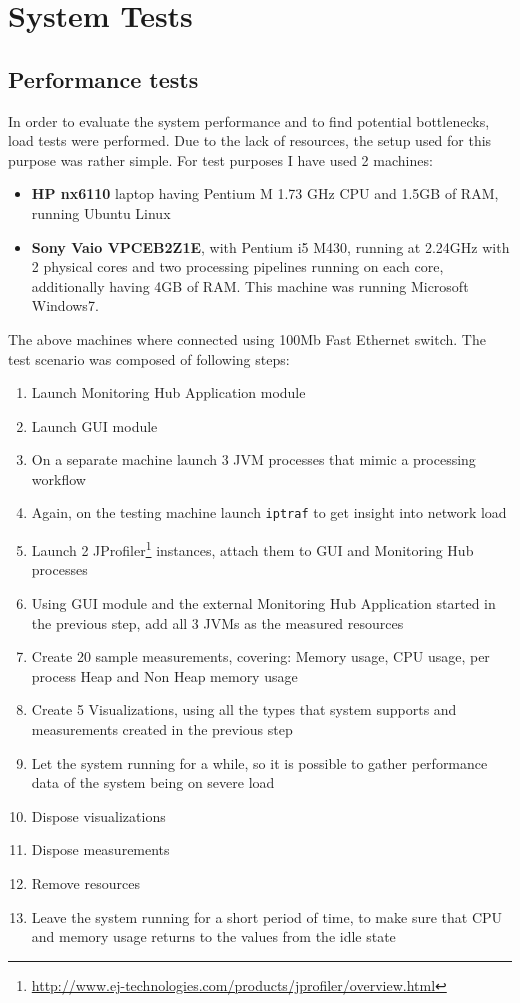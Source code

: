 %
\section{System Tests}
\label{sec:tests}
\subsection{Performance tests}

In order to evaluate the system performance and to find potential bottlenecks, load tests were performed. Due to the lack of resources, the setup used for this purpose was rather simple. For test purposes I have used 2 machines: 

\begin{itemize}
\item {\bf HP nx6110} laptop having Pentium M 1.73 GHz CPU and 1.5GB of RAM, running Ubuntu Linux
\item {\bf Sony Vaio VPCEB2Z1E}, with Pentium i5 M430, running at 2.24GHz with 2 physical cores and two processing pipelines running on each core, additionally having 4GB of RAM. This machine was running Microsoft Windows7.
\end{itemize}

The above machines where connected using 100Mb Fast Ethernet switch. The test scenario was composed of following steps:

\begin{enumerate}
\item Launch Monitoring Hub Application module
\item Launch GUI module
\item On a separate machine launch 3 JVM processes that mimic a processing workflow
\item Again, on the testing machine launch \texttt{iptraf} to get insight into network load
\item Launch 2 JProfiler\footnote{\url{http://www.ej-technologies.com/products/jprofiler/overview.html}} instances, attach them to GUI and Monitoring Hub processes
\item Using GUI module and the external Monitoring Hub Application started in the previous step, add all 3 JVMs as the measured resources
\item Create 20 sample measurements, covering: Memory usage, CPU usage, per process Heap and Non Heap memory usage
\item Create 5 Visualizations, using all the types that system supports and measurements created in the previous step
\item Let the system running for a while, so it is possible to gather performance data of the system being on severe load
\item Dispose visualizations
\item Dispose measurements
\item Remove resources
\item Leave the system running for a short period of time, to make sure that CPU and memory usage returns to the values from the idle state
\end{enumerate}

